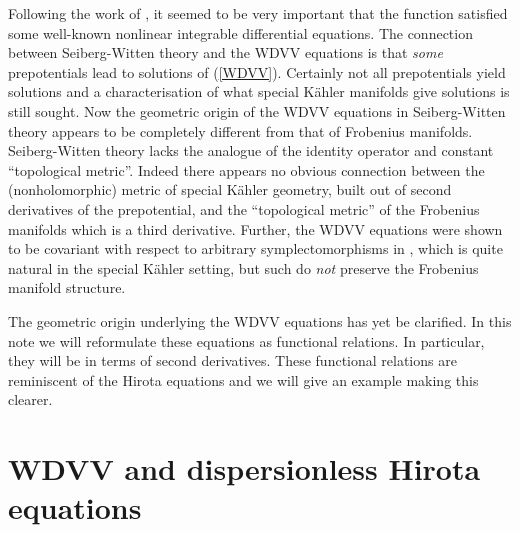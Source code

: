 \documentclass[a4paper,]{article}
\def\F{{\cal F}}
\def\f{{\sf F}}
\begin{document}
Following the work of \cite{GKMMM}, it seemed to be very important that the
function \myHighlight{$\F$}\coordHE{} satisfied some well-known nonlinear integrable differential 
equations.
The connection between Seiberg-Witten theory and the WDVV equations is
that {\it some} prepotentials lead to solutions of (\ref{WDVV}). Certainly not
all prepotentials yield solutions and a characterisation of what
special K\"ahler manifolds give solutions is still sought.
Now the geometric origin of the WDVV equations in Seiberg-Witten theory
appears to be completely different from that of Frobenius manifolds.
Seiberg-Witten theory lacks the analogue of the identity operator
and constant ``topological metric''. Indeed there appears no obvious connection
between the (nonholomorphic) metric of special K\"ahler geometry,
built out of second derivatives of the prepotential, and the
``topological metric'' \myHighlight{$\f_1$}\coordHE{} of the Frobenius manifolds which is a third
derivative.
Further,  the WDVV equations were shown to be covariant with respect to
arbitrary symplectomorphisms in \cite{dWM}, which is quite natural in
the special K\"ahler setting, but such do {\em not} preserve the 
Frobenius manifold structure.

The geometric origin underlying the WDVV equations has yet be clarified. 
In this note we will reformulate these equations as functional relations. 
In particular, they will be in terms of second derivatives.
These functional relations are reminiscent of the Hirota equations
and we will give an example making this clearer.

\section{WDVV and dispersionless Hirota equations}
\end{document}
